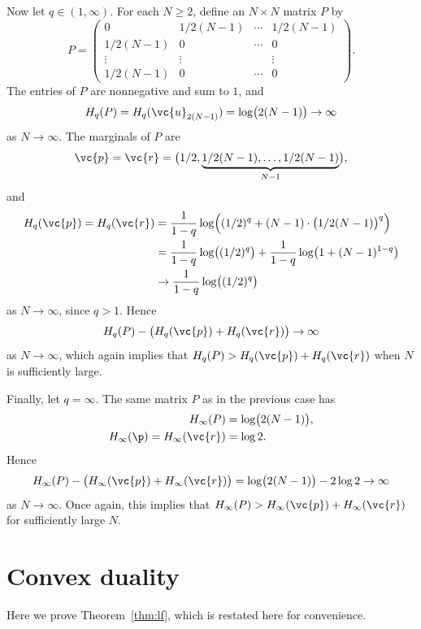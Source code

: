 Now let $q \in (1, \infty)$.  For each $N \geq 2$, define an $N \times N$
matrix $P$ by
\[
P
=
\begin{pmatrix}
0               &1/2(N - 1)     &\cdots &1/2(N - 1)     \\
1/2(N - 1)      &0              &\cdots &0              \\
\vdots          &\vdots         &       &\vdots         \\
1/2(N - 1)      &0              &\cdots &0              
\end{pmatrix}.
\]
The entries of $P$ are nonnegative and sum to $1$, and 
\[
H_q(P)
=
H_q(\vc{u}_{2(N - 1)})
=
\log\bigl(2(N - 1)\bigr)
\to 
\infty
\]
as $N \to \infty$.  The marginals of $P$ are
\[
\vc{p} = \vc{r} =
\bigl( 1/2, 
\underbrace{1/2(N - 1), \ldots, 1/2(N - 1)}_{N - 1}
\bigr),
\]
and
% 
\begin{align*}
H_q(\vc{p}) = H_q(\vc{r}) 
&
= 
\frac{1}{1 - q}
\log
\Bigl(
(1/2)^q + (N - 1) \cdot \bigl(1/2(N - 1)\bigr)^q 
\Bigr)  \\
&
=
\frac{1}{1 - q} \log\bigl( (1/2)^q \bigr)
+
\frac{1}{1 - q} \log\bigl( 1 + (N - 1)^{1 - q} \bigr)   \\
&
\to 
\frac{1}{1 - q} \log\bigl( (1/2)^q \bigr)
\end{align*}
% 
as $N \to \infty$, since $q > 1$.  Hence
\[
H_q(P) - \bigl( H_q(\vc{p}) + H_q(\vc{r}) \bigr)
\to 
\infty
\]
as $N \to \infty$, which again implies that $H_q(P) > H_q(\vc{p}) +
H_q(\vc{r})$ when $N$ is sufficiently large.

Finally, let $q = \infty$.  The same matrix $P$ as in the previous case has
% 
\begin{align*}
H_\infty(P)     &
=
\log\bigl(2(N - 1)\bigr),       \\
H_\infty(\p) = H_\infty(\vc{r}) &
=
\log 2.
\end{align*}
% 
Hence
\[
H_\infty(P) - \bigl( H_\infty(\vc{p}) + H_\infty(\vc{r}) \bigr) 
=
\log\bigl(2(N - 1)\bigr) - 2\log 2      
\to 
\infty
\]
as $N \to \infty$.  Once again, this implies that $H_\infty(P) >
H_\infty(\vc{p}) + H_\infty(\vc{r})$ for sufficiently large $N$.


\section{Convex duality}


Here we prove Theorem~\ref{thm:lf}, which is restated here for convenience.

